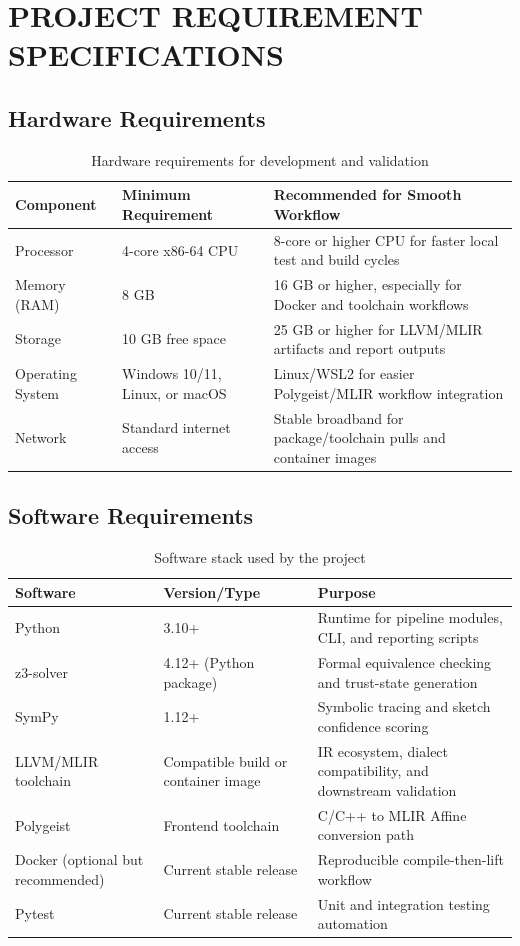 \chapter{PROJECT REQUIREMENT SPECIFICATIONS}

\section{Hardware Requirements}
\begin{table}[H]
\centering
\caption{Hardware requirements for development and validation}
\begin{tabular}{|p{3.5cm}|p{5.0cm}|p{6.0cm}|}
\hline
\textbf{Component} & \textbf{Minimum Requirement} & \textbf{Recommended for Smooth Workflow} \\
\hline
Processor & 4-core x86-64 CPU & 8-core or higher CPU for faster local test and build cycles \\
\hline
Memory (RAM) & 8 GB & 16 GB or higher, especially for Docker and toolchain workflows \\
\hline
Storage & 10 GB free space & 25 GB or higher for LLVM/MLIR artifacts and report outputs \\
\hline
Operating System & Windows 10/11, Linux, or macOS & Linux/WSL2 for easier Polygeist/MLIR workflow integration \\
\hline
Network & Standard internet access & Stable broadband for package/toolchain pulls and container images \\
\hline
\end{tabular}
\end{table}

\section{Software Requirements}
\begin{table}[H]
\centering
\caption{Software stack used by the project}
\begin{tabular}{|p{3.8cm}|p{3.0cm}|p{7.7cm}|}
\hline
\textbf{Software} & \textbf{Version/Type} & \textbf{Purpose} \\
\hline
Python & 3.10+ & Runtime for pipeline modules, CLI, and reporting scripts \\
\hline
z3-solver & 4.12+ (Python package) & Formal equivalence checking and trust-state generation \cite{z3} \\
\hline
SymPy & 1.12+ & Symbolic tracing and sketch confidence scoring \\
\hline
LLVM/MLIR toolchain & Compatible build or container image & IR ecosystem, dialect compatibility, and downstream validation \cite{mlir} \\
\hline
Polygeist & Frontend toolchain & C/C++ to MLIR Affine conversion path \cite{polygeist} \\
\hline
Docker (optional but recommended) & Current stable release & Reproducible compile-then-lift workflow \\
\hline
Pytest & Current stable release & Unit and integration testing automation \\
\hline
\end{tabular}
\end{table}

